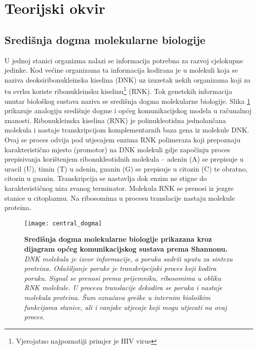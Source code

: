 \section{Teorijski okvir}
\label{ch:ch1}

\subsection{Središnja dogma molekularne biologije}

U jednoj stanici organizma nalazi se informacija potrebna za razvoj cjelokupne jedinke. Kod većine organizama ta informacija kodirana je u molekuli koja se naziva deoksiribonukleinska kiselina  (DNK) uz izuzetak nekih organizama koji za tu svrhu koriste ribonukleinsku kiselinu\footnote{Vjerojatno najpoznatiji primjer je HIV virus} (RNK).
Tok genetskih informacija unutar biološkog sustava naziva se središnja dogma molekularne biologije. Slika \ref{fig:dogma} prikazuje analogiju središnje dogme i općeg komunikacijskog modela u računalnoj znanosti. Ribonukleinska kiselina (RNK) je polinukleotidna jednolančana molekula i nastaje transkripcijom komplementarnih baza gena iz molekule DNK. Ovaj se proces odvija pod utjecajem enzima RNK polimeraza koji prepoznaju karakteristično mjesto (promotor) na DNK molekuli gdje započinju proces prepisivanja korištenjem ribonukleotidnih molekula – adenin (A) se prepisuje u uracil (U), timin (T) u adenin, guanin (G) se prepisuje u citozin (C) te obratno, citozin u guanin. Transkripcija se nastavlja dok enzim ne stigne do karakterističnog niza zvanog terminator. Molekula RNK se prenosi iz jezgre stanice u citoplazmu. Na ribosomima u procesu translacije nastaju molekule proteina\cite{Brown01}.
\par
\begin{center}
   \begin{figure}[ht!]
      \begin{center}
         \texttt{[image: central\_dogma]}
                 \caption[Središnja dogma molekularne biologije]{\textbf{Središnja dogma molekularne biologije prikazana kroz dijagram općeg komunikacijskog sustava prema Shannonu\cite{Shannon01}.} \textit{DNK molekula je izvor informacije, a poruka sadrži uputu za sintezu proteina. Odašiljanje poruke je transkripcijski proces koji kodira poruku. Signal se prenosi prema prijemniku, ribosomima u obliku RNK molekule. U procesu translacije dekodira se poruka i nastaje molekula proteina. Šum označava greške u internim biološkim funkcijama stanice, ali i vanjske utjecaje koji mogu utjecati na ovaj proces.}}
         \label{fig:dogma}
      \end{center}
   \end{figure}
\end{center}

